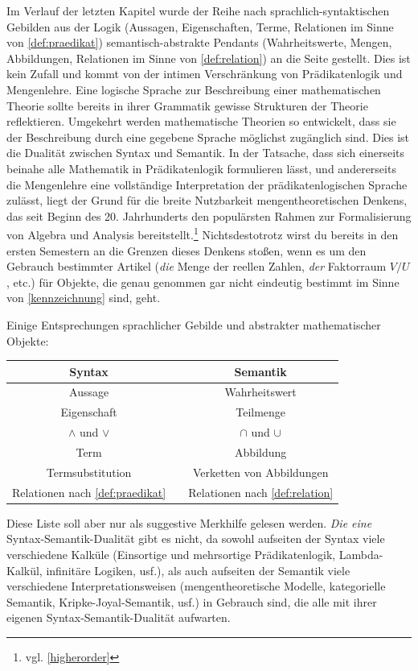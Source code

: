 \begin{bem} \label{syntaxvssemantik} 
    Im Verlauf der letzten Kapitel wurde der Reihe nach sprachlich-syntaktischen Gebilden aus der Logik (Aussagen, Eigenschaften, Terme, Relationen im Sinne von \cref{def:praedikat}) semantisch-abstrakte Pendants (Wahrheitswerte, Mengen, Abbildungen, Relationen im Sinne von \cref{def:relation}) an die Seite gestellt. Dies ist kein Zufall und kommt von der intimen Verschränkung von Prädikatenlogik und Mengenlehre. Eine logische Sprache zur Beschreibung einer mathematischen Theorie sollte bereits in ihrer Grammatik gewisse Strukturen der Theorie reflektieren. Umgekehrt werden mathematische Theorien so entwickelt, dass sie der Beschreibung durch eine gegebene Sprache möglichst zugänglich sind. Dies ist die Dualität zwischen Syntax und Semantik. In der Tatsache, dass sich einerseits beinahe alle Mathematik in Prädikatenlogik formulieren lässt, und andererseits die Mengenlehre eine vollständige Interpretation der prädikatenlogischen Sprache zulässt, liegt der Grund für die breite Nutzbarkeit mengentheoretischen Denkens, das seit Beginn des 20. Jahrhunderts den populärsten Rahmen zur Formalisierung von Algebra und Analysis bereitstellt.\footnote{vgl. \cref{higherorder}} Nichtsdestotrotz wirst du bereits in den ersten Semestern an die Grenzen dieses Denkens stoßen, wenn es um den Gebrauch bestimmter Artikel (\emph{die} Menge der reellen Zahlen, \emph{der} Faktorraum $V/U$, etc.) für Objekte, die genau genommen gar nicht eindeutig bestimmt im Sinne von \cref{kennzeichnung} sind, geht.

    Einige Entsprechungen sprachlicher Gebilde und abstrakter mathematischer Objekte:
    \begin{center}
    \begin{tabular}{ccc}
        Syntax &\phantom{a}& Semantik \\
        \midrule
        Aussage && Wahrheitswert \\
        Eigenschaft && Teilmenge \\
        $\land$ und $\lor$ && $\cap$ und $\cup$ \\
        Term && Abbildung \\
        Termsubstitution && Verketten von Abbildungen \\
        Relationen nach \cref{def:praedikat} && Relationen nach \cref{def:relation}
    \end{tabular}
    \end{center}
    Diese Liste soll aber nur als suggestive Merkhilfe gelesen werden. \emph{Die eine} Syntax-Semantik-Dualität gibt es nicht, da sowohl aufseiten der Syntax viele verschiedene Kalküle (Einsortige und mehrsortige Prädikatenlogik, Lambda-Kalkül, infinitäre Logiken, usf.), als auch aufseiten der Semantik viele verschiedene Interpretationsweisen (mengentheoretische Modelle, kategorielle Semantik, Kripke-Joyal-Semantik, usf.) in Gebrauch sind, die alle mit ihrer eigenen Syntax-Semantik-Dualität aufwarten.
\end{bem}


